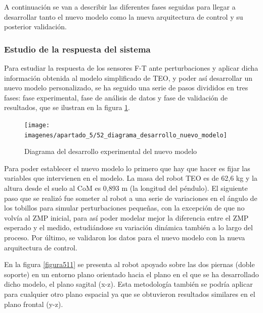 A continuación se van a describir las diferentes fases seguidas para llegar a desarrollar tanto el nuevo modelo como la nueva arquitectura de control y su posterior validación.

\subsubsection{Estudio de la respuesta del sistema}

Para estudiar la respuesta de los sensores F-T ante perturbaciones y aplicar dicha información obtenida al modelo simplificado de TEO, y poder así desarrollar un nuevo modelo personalizado, se ha seguido una serie de pasos divididos en tres fases: fase experimental, fase de análisis de datos y fase de validación de resultados, que se ilustran en la figura \ref{figura510}. 

\begin{figure}[H]
\centering
\texttt{[image: imagenes/apartado\_5/52\_diagrama\_desarrollo\_nuevo\_modelo]}
\caption{Diagrama del desarrollo experimental del nuevo modelo}
\label{figura510}
\end{figure}

Para poder establecer el nuevo modelo lo primero que hay que hacer es fijar las variables que intervienen en el modelo. La masa del robot TEO es de 62,6 kg y la altura desde el suelo al CoM es 0,893 m (la longitud del péndulo). El siguiente paso que se realizó fue someter al robot a una serie de variaciones en el ángulo de los tobillos para simular perturbaciones pequeñas, con la excepción de que no volvía al ZMP inicial, para así poder modelar mejor la diferencia entre el ZMP esperado y el medido, estudiándose su variación dinámica también a lo largo del proceso. Por último, se validaron los datos para el nuevo modelo con la nueva arquitectura de control.

En la figura \ref{figura511} se presenta al robot apoyado sobre las dos piernas (doble soporte) en un entorno plano orientado hacia el plano en el que se ha desarrollado dicho modelo, el plano sagital (x-z). Esta metodología también se podría aplicar para cualquier otro plano espacial ya que se obtuvieron resultados similares en el plano frontal (y-z). 

